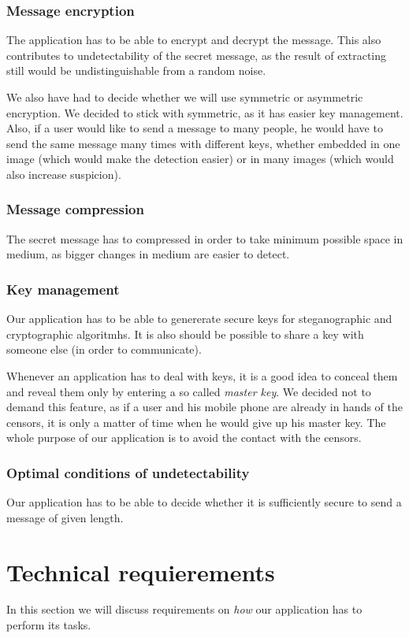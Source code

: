 \subsubsection{Message encryption}
The application has to be able to encrypt and decrypt the message. This also contributes
to undetectability of the secret message, as the result of extracting still would be 
undistinguishable from a random noise.

We also have had to decide whether we will use symmetric or asymmetric
encryption. We decided to stick with symmetric, as it has easier key management.
Also, if a user would like to send a message to many people, he would have to
send the same message many times with different keys, whether embedded in one 
image (which would make the detection easier) or in many images (which would
also increase suspicion).

\subsubsection{Message compression}
The secret message has to compressed in order to take minimum possible space in medium,
as bigger changes in medium are easier to detect.

\subsubsection{Key management}
Our application has to be able to genererate secure keys for steganographic and
cryptographic algoritmhs. It is also should be possible to share a key with someone
else (in order to communicate).

Whenever an application has to deal with keys, it is a good idea to conceal them
and reveal them only by entering a so called \emph{master key}. We decided not to demand
this feature, as if a user and his mobile phone are already in hands of the censors, it is only 
a matter of time when he would give up his master key. The whole purpose of our application
is to avoid the contact with the censors.

\subsubsection{Optimal conditions of undetectability}
Our application has to be able to decide whether it is sufficiently secure to 
send a message of given length. 



\section{Technical requierements}
In this section we will discuss requirements on \emph{how} our application has
to perform its tasks.

